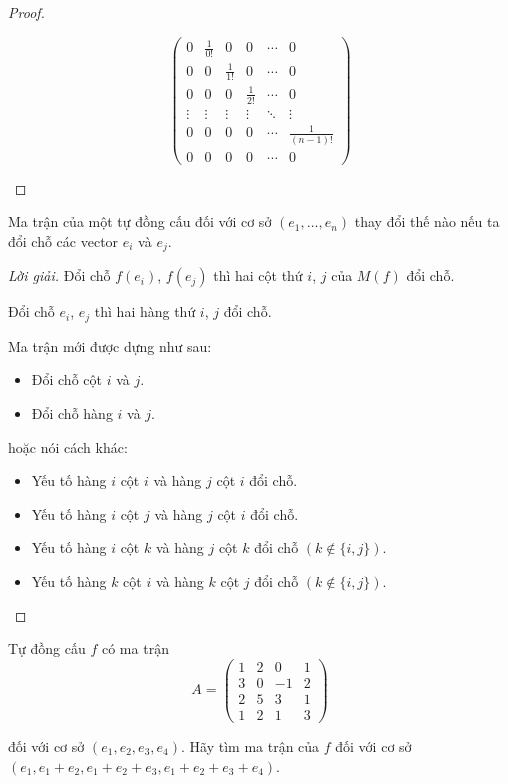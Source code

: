 \documentclass[class=linearalgebra,crop=false]{standalone}
\begin{document}
\begin{proof}
\begin{enumerate}[label = (\alph*)]
\[                \begin{pmatrix}
                    0 & \frac{1}{0!} & 0 & 0 & \cdots & 0 \\
                    0 & 0 & \frac{1}{1!} & 0 & \cdots & 0 \\
                    0 & 0 & 0 & \frac{1}{2!} & \cdots & 0 \\
                    \vdots & \vdots & \vdots & \vdots & \ddots & \vdots \\
                    0 & 0 & 0 & 0 & \cdots & \frac{1}{(n-1)!} \\
                    0 & 0 & 0 & 0 & \cdots & 0
                \end{pmatrix}
            \]
    \end{enumerate}
\end{proof}

\begin{exercise}
    Ma trận của một tự đồng cấu đối với cơ sở $(e_{1},\ldots,e_{n})$ thay đổi thế nào nếu ta đổi chỗ các vector $e_{i}$ và $e_{j}$.
\end{exercise}

\begin{proof}[Lời giải]
    Đổi chỗ $f(e_{i})$, $f(e_{j})$ thì hai cột thứ $i$, $j$ của $M(f)$ đổi chỗ.
    \par Đổi chỗ $e_{i}$, $e_{j}$ thì hai hàng thứ $i$, $j$ đổi chỗ.
    \par Ma trận mới được dựng như sau:
    \begin{itemize}
        \item Đổi chỗ cột $i$ và $j$.
        \item Đổi chỗ hàng $i$ và $j$.
    \end{itemize}
    \par hoặc nói cách khác:
    \begin{itemize}
        \item Yếu tố hàng $i$ cột $i$ và hàng $j$ cột $i$ đổi chỗ.
        \item Yếu tố hàng $i$ cột $j$ và hàng $j$ cột $i$ đổi chỗ.
        \item Yếu tố hàng $i$ cột $k$ và hàng $j$ cột $k$ đổi chỗ $(k\not\in\{ i, j \})$.
        \item Yếu tố hàng $k$ cột $i$ và hàng $k$ cột $j$ đổi chỗ $(k\not\in\{ i, j \})$.
    \end{itemize}
\end{proof}

\begin{exercise}
    Tự đồng cấu $f$ có ma trận
    \[
        A =
        \begin{pmatrix}
            1 & 2 & 0  & 1 \\
            3 & 0 & -1 & 2 \\
            2 & 5 & 3  & 1 \\
            1 & 2 & 1  & 3
        \end{pmatrix}
    \]
    \par đối với cơ sở $(e_{1}, e_{2}, e_{3}, e_{4})$. Hãy tìm ma trận của $f$ đối với cơ sở $(e_{1}, e_{1} + e_{2}, e_{1} + e_{2} + e_{3}, e_{1} + e_{2} + e_{3} + e_{4})$.
\end{exercise}
\end{document}
